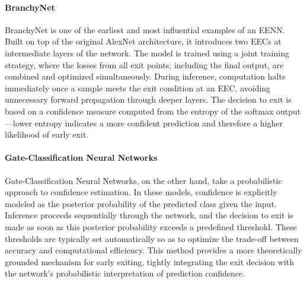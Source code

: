 \paragraph*{BranchyNet}
BranchyNet is one of the earliest and most influential examples of an EENN. 
Built on top of the original AlexNet architecture, it introduces two EECs at intermediate layers of the network. 
The model is trained using a joint training strategy, where the losses from all exit points, including the final output, are combined and optimized simultaneously. 
During inference, computation halts immediately once a sample meets the exit condition at an EEC, avoiding unnecessary forward propagation through deeper layers. 
The decision to exit is based on a confidence measure computed from the entropy of the softmax output—lower entropy indicates a more confident prediction and therefore a higher likelihood of early exit.

\paragraph*{Gate-Classification Neural Networks}
Gate-Classification Neural Networks, on the other hand, take a probabilistic approach to confidence estimation. 
In these models, confidence is explicitly modeled as the posterior probability of the predicted class given the input. 
Inference proceeds sequentially through the network, and the decision to exit is made as soon as this posterior probability exceeds a predefined threshold. 
These thresholds are typically set automatically so as to optimize the trade-off between accuracy and computational efficiency. 
This method provides a more theoretically grounded mechanism for early exiting, tightly integrating the exit decision with the network's probabilistic interpretation of prediction confidence.